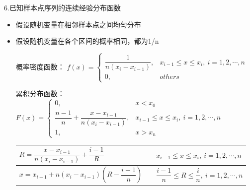 \begin{example}
    6.\textcolor{thid2}{已知样本点序列}\textcolor{thid1}{的连续经验分布函数}
    \begin{itemize}
        \item 假设随机变量在相邻样本点之间\textcolor{thid1}{均匀分布}
        \item 假设随机变量在\textcolor{thid1}{各个区间的概率相同}，都为\textcolor{thid1}{1/n}
        
        概率密度函数：
        $
        f(x)=
        \left\{  
        \begin{array}{lr} 
            \dfrac{1}{n(x_{i}-x_{i-1})}  , &x_{i-1}\leqslant x \leqslant x_{i},\ i = 1,2,\cdots,n\\
            0, &others
        \end{array}  
        \right.  
        $
        
        累积分布函数：$
        F(x)=
        \left\{  
        \begin{array}{lr} 
            0, & x<x_{0}\\
            \dfrac{n-1}{n} + \dfrac{x-x_{i-1}}{n(x_{i}-x_{i-1})}  , &x_{i-1}\leqslant x \leqslant x_{i},\ i = 1,2,\cdots,n\\
            1, &x>x_{n}
        \end{array}  
        \right.  
        $
        \begin{table}[H]
            \centering
            \begin{tabular}{lll}
                \arrayrulecolor{red}
                $R = \dfrac{x-x_{i-1}}{n(x_{i}-x_{i-1})}+\dfrac{i-1}{R}$ &
                &
                $x_{i-1}\leqslant x \leqslant x_{i},\ i = 1,2,\cdots,n$ \\ \hline
                \multicolumn{1}{|l}{$x = x_{i-1}+n\left( x_{i}-x_{i-1} \right) \left( R-\dfrac{i-1}{n} \right) $} &
                &
                \multicolumn{1}{l|}{$\dfrac{i-1}{n} \leqslant R \leqslant \dfrac{i}{n},\ i = 1,2,\cdots,n$} \\ \hline
            \end{tabular}
        \end{table}
    \end{itemize}
\end{example}
